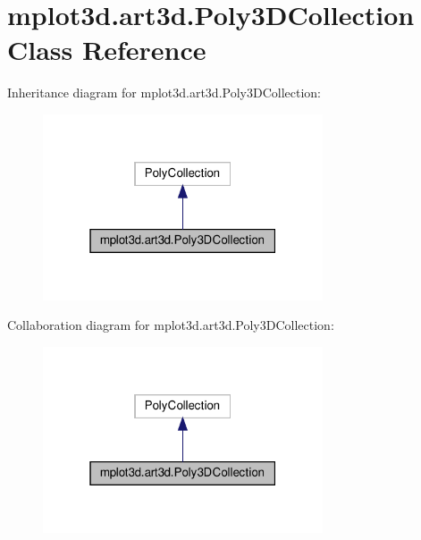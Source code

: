 \hypertarget{classmplot3d_1_1art3d_1_1Poly3DCollection}{}\section{mplot3d.\+art3d.\+Poly3\+D\+Collection Class Reference}
\label{classmplot3d_1_1art3d_1_1Poly3DCollection}


Inheritance diagram for mplot3d.\+art3d.\+Poly3\+D\+Collection\+:
\nopagebreak
\begin{figure}[H]
\begin{center}
\leavevmode
\includegraphics[width=235pt]{classmplot3d_1_1art3d_1_1Poly3DCollection__inherit__graph}
\end{center}
\end{figure}


Collaboration diagram for mplot3d.\+art3d.\+Poly3\+D\+Collection\+:
\nopagebreak
\begin{figure}[H]
\begin{center}
\leavevmode
\includegraphics[width=235pt]{classmplot3d_1_1art3d_1_1Poly3DCollection__coll__graph}
\end{center}
\end{figure}
